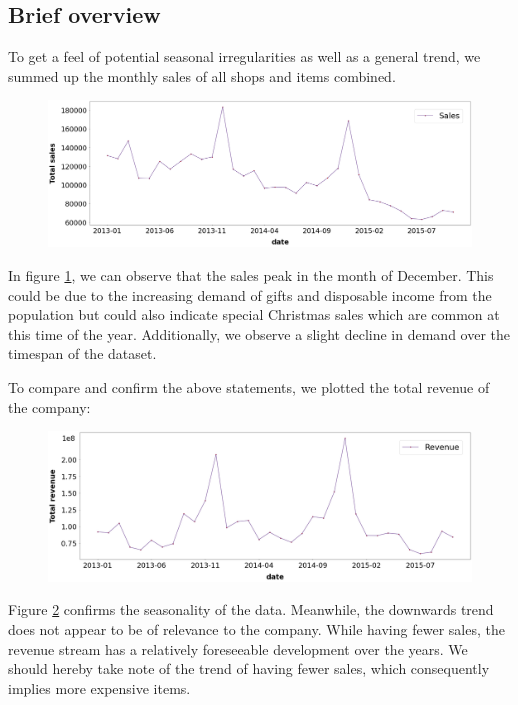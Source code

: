 \subsection{Brief overview}

To get a feel of potential seasonal irregularities as well as a general trend, we summed up the monthly sales of all shops and items combined.

\begin{figure}[h]
  \centering
  \includegraphics[width=0.86\linewidth]{external_content/graphs/total_sales.png}
  \captionsetup{justification=centering}
  \label{fig:total_sales}
\end{figure}


In figure \ref{fig:total_sales}, we can observe that the sales peak in the month of December. This could be due to the increasing demand of gifts and disposable income from the population but could also indicate special Christmas sales which are common at this time of the year. Additionally, we observe a slight decline in demand over the timespan of the dataset.

To compare and confirm the above statements, we plotted the total revenue of the company:

\begin{figure}[h]
  \centering
  \includegraphics[width=0.9\linewidth]{external_content/graphs/total_revenue.png}
  \captionsetup{justification=centering}
  \label{fig:total_revenue}
\end{figure}

Figure \ref{fig:total_revenue} confirms the seasonality of the data. Meanwhile, the downwards trend does not appear to be of relevance to the company.
While having fewer sales, the revenue stream has a relatively foreseeable development over the years. We should hereby take note of the trend of having fewer sales, which consequently implies more expensive items.

